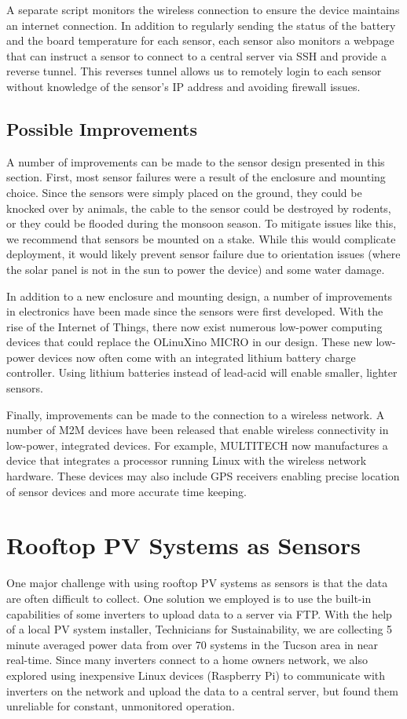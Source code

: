 A separate script monitors the wireless connection to ensure the
device maintains an internet connection.
In addition to regularly sending the status of the battery and the
board temperature for each sensor, each sensor also monitors a webpage
that can instruct a sensor to connect to a central server via SSH and
provide a reverse tunnel.
This reverses tunnel allows us to remotely login to each sensor without
knowledge of the sensor's IP address and avoiding firewall issues.

\subsection{Possible Improvements}
\label{sec:sensor_improvements}
A number of improvements can be made to the sensor design presented in
this section.
First, most sensor failures were a result of the enclosure and
mounting choice.
Since the sensors were simply placed on the ground, they could be
knocked over by animals, the cable to the sensor could be destroyed by
rodents, or they could be flooded during the monsoon season.
To mitigate issues like this, we recommend that sensors be mounted on
a stake.
While this would complicate deployment, it would likely
prevent sensor failure due to orientation issues (where the solar
panel is not in the sun to power the device) and some water damage.

In addition to a new enclosure and mounting design, a number of
improvements in electronics have been made since the sensors were first
developed.
With the rise of the Internet of Things, there now exist numerous
low-power computing devices that could replace the OLinuXino MICRO in
our design.
These new low-power devices now often come with an integrated lithium
battery charge controller.
Using lithium batteries instead of lead-acid will enable smaller,
lighter sensors.

Finally, improvements can be made to the connection to a wireless
network.
A number of M2M devices have been released that enable wireless
connectivity in low-power, integrated devices.
For example, MULTITECH now manufactures a device that integrates a
processor running Linux with the wireless network hardware.
These devices may also include GPS receivers enabling precise location
of sensor devices and more accurate time keeping.

\section{Rooftop PV Systems as Sensors}
\label{sec:pv_sensors}
One major challenge with using rooftop PV systems as sensors is that
the data are often difficult to collect.
One solution we employed is to use the built-in capabilities of some
inverters to upload data to a server via FTP.
With the help of a local PV system installer, Technicians for
Sustainability, we are collecting 5 minute averaged power data from
over 70 systems in the Tucson area in near real-time.
Since many inverters connect to a home owners network, we also
explored using inexpensive Linux devices (Raspberry Pi) to communicate with
inverters on the network and upload the data to a central server, but
found them unreliable for constant, unmonitored operation.

